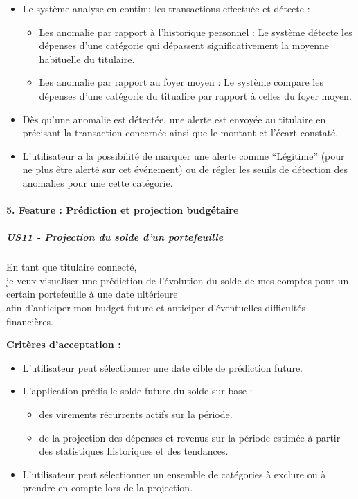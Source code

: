 \begin{itemize}
\tightlist
\item
  Le système analyse en continu les transactions effectuée et détecte :

  \begin{itemize}
  \tightlist
  \item
    Les anomalie par rapport à l'historique personnel : Le système
    détecte les dépenses d'une catégorie qui dépassent significativement
    la moyenne habituelle du titulaire.
  \item
    Les anomalie par rapport au foyer moyen : Le système compare les
    dépenses d'une catégorie du titualire par rapport à celles du foyer
    moyen.
  \end{itemize}
\item
  Dès qu'une anomalie est détectée, une alerte est envoyée au titulaire
  en précisant la transaction concernée ainsi que le montant et l'écart
  constaté.
\item
  L'utilisateur a la possibilité de marquer une alerte comme
  ``Légitime'' (pour ne plus être alerté sur cet événement) ou de régler
  les seuils de détection des anomalies pour une cette catégorie.
\end{itemize}

\hypertarget{feature-pruxe9diction-et-projection-budguxe9taire}{%
\paragraph{5. Feature : Prédiction et projection
budgétaire}\label{feature-pruxe9diction-et-projection-budguxe9taire}}

\hypertarget{us11---projection-du-solde-dun-portefeuille}{%
\subparagraph{US11 - Projection du solde d'un
portefeuille}\label{us11---projection-du-solde-dun-portefeuille}}

En tant que titulaire connecté,\\
je veux visualiser une prédiction de l'évolution du solde de mes comptes
pour un certain portefeuille à une date ultérieure\\
afin d'anticiper mon budget future et anticiper d'éventuelles
difficultés financières.

\textbf{Critères d'acceptation :}

\begin{itemize}
\tightlist
\item
  L'utilisateur peut sélectionner une date cible de prédiction future.
\item
  L'application prédis le solde future du solde sur base :

  \begin{itemize}
  \tightlist
  \item
    des virements récurrents actifs sur la période.
  \item
    de la projection des dépenses et revenus sur la période estimée à
    partir des statistiques historiques et des tendances.
  \end{itemize}
\item
  L'utilisateur peut sélectionner un ensemble de catégories à exclure ou
  à prendre en compte lors de la projection.
\end{itemize}
